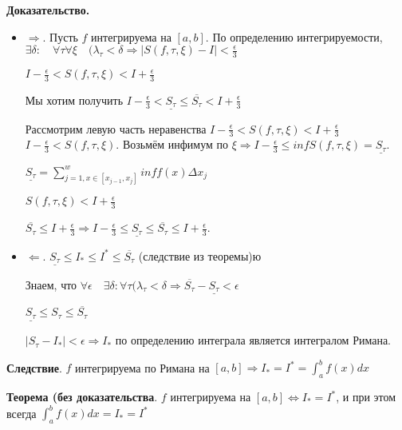 \documentclass[a4paper]{article}
\begin{document}
\begin{hproof}\textbf{Доказательство.}
\begin{itemize}
\item $\Rightarrow$.  Пусть $f$ интегрируема на $[a,b]$. По определению интегрируемости, $\displaystyle \exists \delta: \quad	\forall \tau \forall \xi \quad (\lambda_\tau < \delta  \Rightarrow |S(f,  \tau, \xi) - I| < \frac{\epsilon}{3}$

$\displaystyle I - \frac{\epsilon}{3} < S(f, \tau, \xi) < I + \frac{\epsilon}{3}$

Мы хотим получить $\displaystyle I - \frac{\epsilon}{3} < \underline{S_\tau} \leq \overline{S_\tau} < I + \frac{\epsilon}{3}$

Рассмотрим левую часть неравенства $\displaystyle I - \frac{\epsilon}{3} < S(f, \tau, \xi) < I + \frac{\epsilon}{3}$
 $\displaystyle I - \frac{\epsilon}{3} < S(f, \tau, \xi)$. Возьмём инфимум по $\xi \Rightarrow I - \frac{\epsilon}{3} \leq inf S(f, \tau, \xi) = \underline{S_\tau}$.

$\underline{S_\tau} = \sum_{j=1, x \in [x_{j-1}, x_j]}^w inf f(x) \Delta x_j$

$S(f, \tau, \xi) < I + \frac{\epsilon}{3}$

$\overline{S_\tau} \leq I+\frac{\epsilon}{3} \Rightarrow I - \frac{\epsilon}{3} \leq \underline{S_\tau} \leq \overline{S_\tau} \leq I + \frac{\epsilon}{3}$.

\item $\Leftarrow$. $\underline{S_\tau} \leq I_* \leq I^* \leq \overline{S_\tau}$ (следствие из теоремы)ю

Знаем, что $\forall \epsilon \quad \exists \delta: \forall \tau (\lambda_\tau < \delta \Rightarrow \overline{S_\tau} - \underline{S_\tau} < \epsilon$

$\underline{S_\tau} \leq S_\tau \leq \overline{S_\tau}$

$|S_\tau - I_*| < \epsilon \Rightarrow I_*$ по определению интеграла является интегралом Римана.
\end{itemize}

\end{hproof}



\begin{htheorem}\textbf{Следствие}. $f$ интегрируема по Римана на $\displaystyle [a,b] \Rightarrow I_* = I^* = \int_a^b f(x) dx$
\end{htheorem}

\begin{htheorem}\textbf{Теорема (без доказательства}.
$f$ интегрируема на $[a,b] \Leftrightarrow I_* = I^*$, и при этом всегда $\displaystyle \int_a^b f(x) dx = I_* = I^*$


\end{htheorem}
\end{document}
